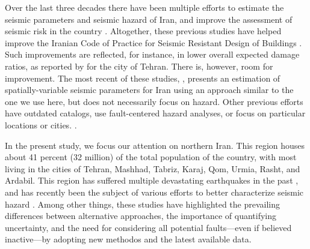 Over the last three decades there have been multiple efforts to estimate the seismic parameters and seismic hazard of Iran, and improve the assessment of seismic risk in the country \citep[e.g.,][]{Tavakoli1999, Moinfar_2000_Chap, Ghodrati2003, Moinfar_2012_WCEE, Khodaverdian_2016_BSSA}. Altogether, these previous studies have helped improve the Iranian Code of Practice for Seismic Resistant Design of Buildings \citep{BHRC2014}. Such improvements are reflected, for instance, in lower overall expected damage ratios, as reported by \citet{Ghodrati2013} for the city of Tehran. There is, however, room for improvement. The most recent of these studies, \citet{Khodaverdian_2016_BSSA}, presents an estimation of spatially-variable seismic parameters for Iran using an approach similar to the one we use here, but does not necessarily focus on hazard. Other previous efforts  have outdated catalogs, use fault-centered hazard analyses, or focus on particular locations or cities. .

In the present study, we focus our attention on northern Iran. This region houses about 41 percent (32 million) of the total population of the country, with most living in the cities of Tehran, Mashhad, Tabriz, Karaj, Qom, Urmia, Rasht, and Ardabil. This region has suffered multiple devastating earthquakes in the past \citep[e.g.,][]{Mehrain_1990_Tech, Chafory-Ashtiany_1999_DPM, Razzaghi_2012_Tech}, and has recently been the subject of various efforts to better characterize seismic hazard \citep[e.g.,][]{Abdollahzadeh2014a, Boostan2015}. Among other things, these studies have highlighted the prevailing differences between alternative approaches, the importance of quantifying uncertainty, and the need for considering all potential faults---even if believed inactive---by adopting new methodos and the latest available data.


